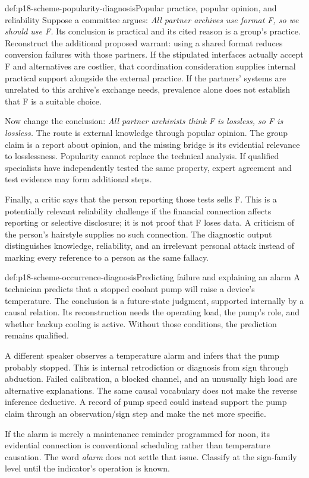 \begin{hbexample}{def:p18-scheme-popularity-diagnosis}{Popular practice, popular opinion, and reliability}
Suppose a committee argues: \emph{All partner archives use format F,
so we should use F.} Its conclusion is practical and its cited reason
is a group's practice. Reconstruct the additional proposed warrant:
using a shared format reduces conversion failures with those partners.
If the stipulated interfaces actually accept F and alternatives are
costlier, that coordination consideration supplies internal practical
support alongside the external practice. If the partners' systems
are unrelated to this archive's exchange needs, prevalence alone
does not establish that F is a suitable choice.

Now change the conclusion: \emph{All partner archivists think F is
lossless, so F is lossless.} The route is external knowledge through
popular opinion. The group claim is a report about opinion, and
the missing bridge is its evidential relevance to losslessness.
Popularity cannot replace the technical analysis. If qualified
specialists have independently tested the same property, expert
agreement and test evidence may form additional steps.

Finally, a critic says that the person reporting those tests sells F.
This is a potentially relevant reliability challenge if the financial
connection affects reporting or selective disclosure; it is not proof
that F loses data. A criticism of the person's hairstyle supplies
no such connection. The diagnostic output distinguishes knowledge,
reliability, and an irrelevant personal attack instead of marking
every reference to a person as the same fallacy.
\end{hbexample}

\begin{hbexample}{def:p18-scheme-occurrence-diagnosis}{Predicting failure and explaining an alarm}
A technician predicts that a stopped coolant pump will raise a device's
temperature. The conclusion is a future-state judgment, supported
internally by a causal relation. Its reconstruction needs the
operating load, the pump's role, and whether backup cooling is active.
Without those conditions, the prediction remains qualified.

A different speaker observes a temperature alarm and infers that
the pump probably stopped. This is internal retrodiction or diagnosis
from sign through abduction. Failed calibration, a blocked channel,
and an unusually high load are alternative explanations.
The same causal vocabulary does not make the reverse inference
deductive. A record of pump speed could instead support the pump
claim through an observation/sign step and make the net more specific.

If the alarm is merely a maintenance reminder programmed for noon,
its evidential connection is conventional scheduling rather than
temperature causation. The word \emph{alarm} does not settle that issue.
Classify at the sign-family level until the indicator's operation is known.
\end{hbexample}

